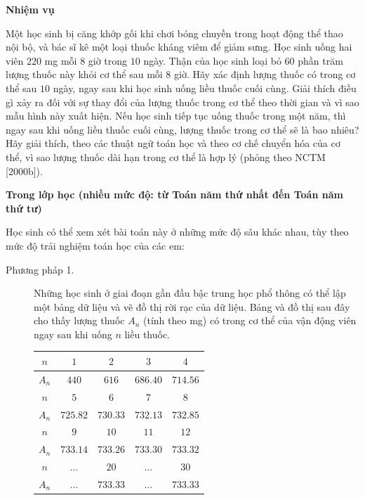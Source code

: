 \documentclass[
  10pt,
  a4paper,
  landscape,
  twoside,
  openany
]{scrbook}
\begin{document}
{
\noindent
\textbf{Nhiệm vụ}

Một học sinh bị căng khớp gối khi chơi bóng chuyền trong hoạt động thể thao nội bộ, và bác sĩ kê một loại thuốc kháng viêm để giảm sưng. Học sinh uống hai viên $220$ mg mỗi $8$ giờ trong $10$ ngày. Thận của học sinh loại bỏ $60$ phần trăm lượng thuốc này khỏi cơ thể sau mỗi $8$ giờ. Hãy xác định lượng thuốc có trong cơ thể sau $10$ ngày, ngay sau khi học sinh uống liều thuốc cuối cùng. Giải thích điều gì xảy ra đối với sự thay đổi của lượng thuốc trong cơ thể theo thời gian và vì sao mẫu hình này xuất hiện. Nếu học sinh tiếp tục uống thuốc trong một năm, thì ngay sau khi uống liều thuốc cuối cùng, lượng thuốc trong cơ thể sẽ là bao nhiêu? Hãy giải thích, theo các thuật ngữ toán học và theo cơ chế chuyển hóa của cơ thể, vì sao lượng thuốc dài hạn trong cơ thể là hợp lý (phỏng theo NCTM [2000b]).

\noindent
\textbf{Trong lớp học (nhiều mức độ: từ Toán năm thứ nhất đến Toán năm thứ tư)}

Học sinh có thể xem xét bài toán này ở những mức độ sâu khác nhau, tùy theo mức độ trải nghiệm toán học của các em:

\begin{description}
  \item[Phương pháp 1.] Những học sinh ở giai đoạn gần đầu bậc trung học phổ thông có thể lập một bảng dữ liệu và vẽ đồ thị rời rạc của dữ liệu. Bảng và đồ thị sau đây cho thấy lượng thuốc $A_n$ (tính theo mg) có trong cơ thể của vận động viên ngay sau khi uống $n$ liều thuốc.
  
  \begin{center}
  \setlength{\tabcolsep}{5pt}
  \begin{tabular}{|c|c|c|c|c|}
  \hline
  $n$   & $1$      & $2$      & $3$      & $4$      \\
  \hline
  $A_n$ & $440$    & $616$    & $686.40$ & $714.56$ \\
  \hline
  $n$   & $5$      & $6$      & $7$      & $8$      \\
  \hline
  $A_n$ & $725.82$ & $730.33$ & $732.13$ & $732.85$ \\
  \hline
  $n$   & $9$      & $10$     & $11$     & $12$     \\
  \hline
  $A_n$ & $733.14$ & $733.26$ & $733.30$ & $733.32$ \\
  \hline
  $n$   & $\dots$  & $20$     & $\dots$  & $30$     \\
  \hline
  $A_n$ & $\dots$  & $733.33$ & $\dots$  & $733.33$ \\
  \hline
  \end{tabular}
  \end{center}


\end{description}}
\end{document}
